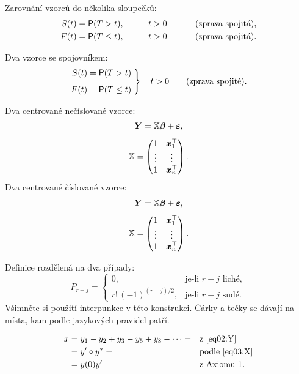Zarovnání vzorců do několika sloupečků:
\begin{alignat*}{3}
S(t) &= \operatorname{\textsf{P}}(T > t),    &\qquad t&>0       &\qquad&\text{ (zprava spojitá),}\\
F(t) &= \operatorname{\textsf{P}}(T \leq t), &\qquad t&>0       &\qquad&\text{ (zprava spojitá).}
\end{alignat*}

Dva vzorce se spojovníkem:
\begin{equation}\label{eq01:FS}
\left.
\begin{aligned}
S(t) &= \pr(T > t) \\[1ex]
F(t) &= \pr(T \leq t)
\end{aligned}
\;	%
\right\}
\quad t>0 \qquad \text{(zprava spojité).}
\end{equation}

Dva centrované nečíslované vzorce:
\begin{gather*}
\bm Y = \mathbb{X}\bm\beta + \bm\varepsilon, \\[1ex]
\mathbb{X} = \begin{pmatrix} 1 & \bm x_1^\top \\ \vdots & \vdots \\ 1 &
  \bm x_n^\top \end{pmatrix}.
\end{gather*}
Dva centrované číslované vzorce:
\begin{gather}
\bm Y = \mathbb{X}\bm\beta + \bm\varepsilon, \label{eq02:Y}\\[1ex]
\mathbb{X} = \begin{pmatrix} 1 & \bm x_1^\top \label{eq03:X}\\ \vdots & \vdots \\ 1 &
  \bm x_n^\top \end{pmatrix}.
\end{gather}

Definice rozdělená na dva případy:
\[
P_{r-j}=
\begin{cases}
0, & \text{je-li $r-j$ liché},\\
r!\,(-1)^{(r-j)/2}, & \text{je-li $r-j$ sudé}.
\end{cases}
\]
Všimněte si použití interpunkce v této konstrukci. Čárky a tečky se
dávají na místa, kam podle jazykových pravidel patří.

\begin{align}
x& = y_1-y_2+y_3-y_5+y_8-\dots = && \text{z \eqref{eq02:Y}} \nonumber\\
& = y'\circ y^* = && \text{podle \eqref{eq03:X}} \nonumber\\
& = y(0) y' && \text {z Axiomu 1.}
\end{align}


